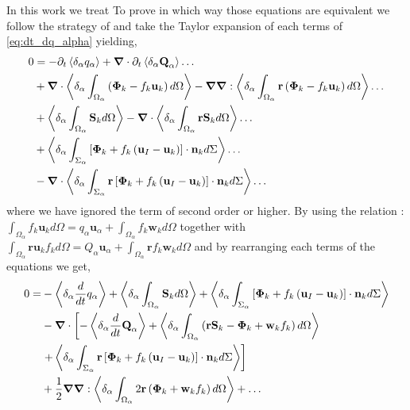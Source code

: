 In this work we treat
To prove in which way those equations are equivalent we follow the strategy of \citep{lhuillier2000bilan} and take the Taylor expansion of each terms of \ref{eq:dt_dq_alpha} yielding, 
\begin{align}    
    0 &= 
    - \partial_t \left<\delta_\alpha q_\alpha\right> +  \bm{\nabla} \cdot  \partial_t\left<\delta_\alpha \textbf{Q}_\alpha\right> \ldots\nonumber\\
    &+ \bm{\nabla} \cdot \left<\delta_\alpha \int_{\Omega_\alpha}\left(\mathbf{\Phi}_k - f_k \textbf{u}_k \right)d\Omega\right>
    -\bm{\nabla}\bm{\nabla} : \left<\delta_\alpha \int_{\Omega_\alpha}\textbf{r}\left(\mathbf{\Phi}_k - f_k \textbf{u}_k \right)d\Omega\right>
    \ldots\nonumber\\
    &+ \left<\delta_\alpha  \int_{\Omega_\alpha} \textbf{S}_k d\Omega\right>
    - \bm{\nabla} \cdot \left<\delta_\alpha  \int_{\Omega_\alpha} \textbf{r}\textbf{S}_k d\Omega\right>
    \ldots\nonumber\\
    &+ \left<\delta_\alpha \int_{\Sigma_\alpha}\left[
        \mathbf{\Phi}_k
        + f_k
        \left(
            \textbf{u}_I
            - \textbf{u}_k
        \right)
    \right]
    \cdot \textbf{n}_kd\Sigma\right> \ldots\nonumber\\
    &-  \bm{\nabla} \cdot \left<\delta_\alpha \int_{\Sigma_\alpha} \textbf{r}\left[
        \mathbf{\Phi}_k
        + f_k
        \left(
            \textbf{u}_I
            - \textbf{u}_k
        \right)
    \right]
    \cdot \textbf{n}_kd\Sigma\right> \ldots
\end{align}
where we have ignored the term of second order or higher. 
By using the relation : $\int_{\Omega_\alpha} f_k \textbf{u}_k d\Omega = q_\alpha\textbf{u}_\alpha  + \int_{\Omega_\alpha} f_k \textbf{w}_k d\Omega$
together with $\int_{\Omega_\alpha} \textbf{r} \textbf{u}_k f_k d\Omega = Q_\alpha\textbf{u}_\alpha  + \int_{\Omega_\alpha}\textbf{r} f_k \textbf{w}_k d\Omega$ and by  rearranging each terms of the equations we get, 
\begin{align}    
    0 = 
    &- \left<\delta_\alpha \frac{d}{d t} q_\alpha\right>
    + \left<\delta_\alpha  \int_{\Omega_\alpha} \textbf{S}_k d\Omega\right>
    + \left<\delta_\alpha \int_{\Sigma_\alpha}\left[
        \mathbf{\Phi}_k
        + f_k
        \left(
            \textbf{u}_I
            - \textbf{u}_k
        \right)
    \right]
    \cdot \textbf{n}_kd\Sigma\right> \nonumber\\
    &-  \bm{\nabla} \cdot  \left[
        - \left<\delta_\alpha \frac{d}{d t} \textbf{Q}_\alpha\right> 
         + \left<\delta_\alpha  \int_{\Omega_\alpha} \left(
            \textbf{r}\textbf{S}_k - \mathbf{\Phi}_k + \textbf{w}_kf_k 
         \right)d\Omega\right>
    \right.
    \nonumber\\
    &\left. 
         + \left<\delta_\alpha \int_{\Sigma_\alpha} \textbf{r}\left[
        \mathbf{\Phi}_k
        + f_k
        \left(
            \textbf{u}_I
            - \textbf{u}_k
        \right)
        \right]
        \cdot \textbf{n}_kd\Sigma\right> 
    \right]\nonumber\\
    &+  \frac{1}{2}\bm{\nabla}\bm{\nabla} :
         \left<\delta_\alpha  \int_{\Omega_\alpha} 2\textbf{r}\left(\mathbf{\Phi}_k + \textbf{w}_kf_k 
         \right)d\Omega\right>
         + \ldots
    \label{eq:expansion_final}
\end{align}
